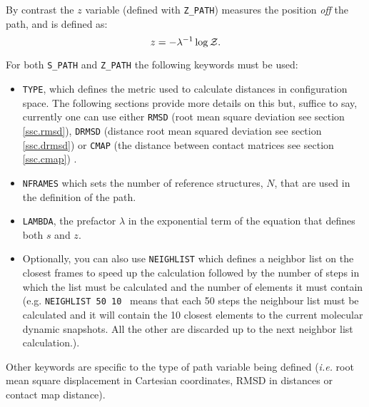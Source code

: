 \documentclass[12pt,fleqn]{report}
\newcommand{\keyword}[1]{\index{Keywords!{\tt #1}} {\tt #1}}
\begin{document}
  
By contrast the $z$ variable (defined with {\tt Z\_PATH}) measures the position
{\it off} the path, and is defined as:
$$ z = - \lambda^{-1} \log {\cal Z}. $$

For both \keyword{S\_PATH} and \keyword{Z\_PATH} the following keywords must be used:
\begin{itemize}
\item {\tt TYPE}, which defines the metric used to calculate distances 
 in configuration space.  The following sections provide more details
 on this but, suffice to say, currently one can use either {\tt RMSD} 
 (root mean square deviation see section \ref{ssc.rmsd}), 
 {\tt DRMSD} (distance root mean squared deviation see section \ref{ssc.drmsd}) 
 or {\tt CMAP} (the distance between contact matrices see section \ref{ssc.cmap}) \cite{Bo.Bra:08}. 
\item {\tt NFRAMES} which sets the  number of reference structures, $N$,
that are used in the definition of the path.
\item {\tt LAMBDA}, the prefactor $\lambda$ in the exponential 
  term of the equation that defines both $s$ and $z$. 
\item Optionally, you can also use {\tt NEIGHLIST} which defines a neighbor list on the closest 
      frames to speed up the calculation followed by the number of steps in which the list must be calculated
and the number of elements it must contain (e.g. {\tt NEIGHLIST 50 10 } means that each 50 steps the neighbour list must be calculated 
and it will contain the 10 closest elements to the current molecular dynamic snapshots. All the other are discarded up to the next neighbor list calculation.).
\end{itemize}
 
Other keywords are specific to the type of path variable being defined
(\emph{i.e.} root mean square displacement in Cartesian coordinates, 
 RMSD in distances or contact map distance). 
\end{document}
